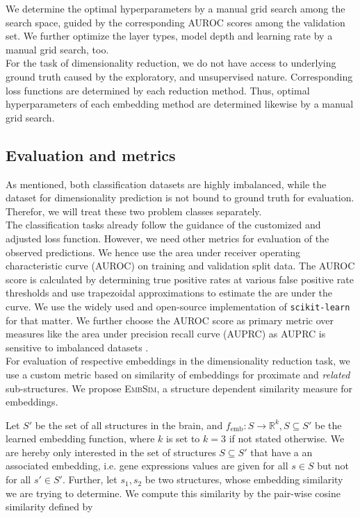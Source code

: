 \documentclass[]{article}
\renewcommand{\cite}{\citep}
\begin{document}
We determine the optimal hyperparameters by a manual grid search among the search space, guided by the corresponding AUROC scores among the validation set. We further optimize the layer types, model depth and learning rate by a manual grid search, too.\\

For the task of dimensionality reduction, we do not have access to underlying ground truth caused by the exploratory, and unsupervised nature. Corresponding loss functions are determined by each reduction method.
Thus, optimal hyperparameters of each embedding method are determined likewise by a manual grid search.

\subsection{Evaluation and metrics}
\label{sec:evalmetrics}

As mentioned, both classification datasets are highly imbalanced, while the dataset for dimensionality prediction is not bound to ground truth for evaluation. Therefor, we will treat these two problem classes separately.\\

The classification tasks already follow the guidance of the customized and adjusted loss function. However, we need other metrics for evaluation of the observed predictions. We hence use the area under receiver operating characteristic curve (AUROC) on training and validation split data.
The AUROC score is calculated by determining true positive rates at various false positive rate thresholds and use trapezoidal approximations to estimate the are under the curve. We use the widely used and open-source implementation of \verb*|scikit-learn| for that matter. We further choose the AUROC score as primary metric over measures like the area under precision recall curve (AUPRC) as AUPRC is sensitive to imbalanced datasets \cite{jeni2013facing}.\\

For evaluation of respective embeddings in the dimensionality reduction task, we use a custom metric based on similarity of embeddings for proximate and \textit{related} sub-structures. We propose \textsc{EmbSim}, a structure dependent similarity measure for embeddings. 

Let $S'$ be the set of all structures in the brain, and $f_{\text{emb}}:S\rightarrow \mathbb{R}^k ,S\subseteq S'$ be the learned embedding function, where $k$ is set to $k=3$ if not stated otherwise. We are hereby only interested in the set of structures $S\subseteq S'$ that have a an associated embedding, i.e. gene expressions values are given for all $s\in S$ but not for all $s'\in S'$. 
Further, let $s_1, s_2$ be two structures, whose embedding similarity we are trying to determine. We compute this similarity by the pair-wise cosine similarity defined by 
\end{document}
